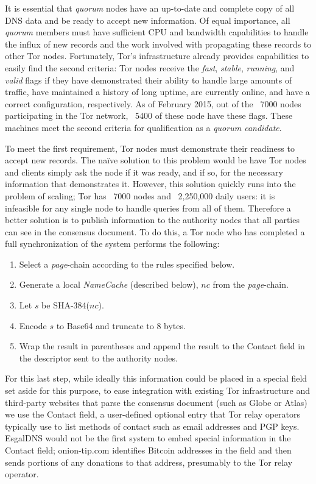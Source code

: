 It is essential that \emph{quorum} nodes have an up-to-date and complete copy of all DNS data and be ready to accept new information. Of equal importance, all \emph{quorum} members must have sufficient CPU and bandwidth capabilities to handle the influx of new records and the work involved with propagating these records to other Tor nodes. Fortunately, Tor's infrastructure already provides capabilities to easily find the second criteria: Tor nodes receive the \emph{fast}, \emph{stable}, \emph{running},  and \emph{valid} flags if they have demonstrated their ability to handle large amounts of traffic, have maintained a history of long uptime, are currently online, and have a correct configuration, respectively. As of February 2015, out of the ~7000 nodes participating in the Tor network, ~5400 of these node have these flags. These machines meet the second criteria for qualification as a \emph{quorum candidate}.

To meet the first requirement, Tor nodes must demonstrate their readiness to accept new records. The na\"{i}ve solution to this problem would be have Tor nodes and clients simply ask the node if it was ready, and if so, for the necessary information that demonstrates it. However, this solution quickly runs into the problem of scaling; Tor has ~7000 nodes and ~2,250,000 daily users\cite{TorMetrics}: it is infeasible for any single node to handle queries from all of them. Therefore a better solution is to publish information to the authority nodes that all parties can see in the consensus document. To do this, a Tor node who has completed a full synchronization of the system performs the following:

\begin{enumerate}
	\item Select a \emph{page}-chain according to the rules specified below.
	\item Generate a local \emph{NameCache} (described below), $ nc $ from the \emph{page}-chain.
	\item Let $ s $ be SHA-384($ nc $).
	\item Encode $ s $ to Base64 and truncate to 8 bytes.
	\item Wrap the result in parentheses and append the result to the Contact field in the descriptor sent to the authority nodes.
\end{enumerate}

For this last step, while ideally this information could be placed in a special field set aside for this purpose, to ease integration with existing Tor infrastructure and third-party websites that parse the consensus document (such as Globe or Atlas) we use the Contact field, a user-defined optional entry that Tor relay operators typically use to list methods of contact such as email addresses and PGP keys. EsgalDNS would not be the first system to embed special information in the Contact field; onion-tip.com identifies Bitcoin addresses in the field and then sends portions of any donations to that address, presumably to the Tor relay operator.

